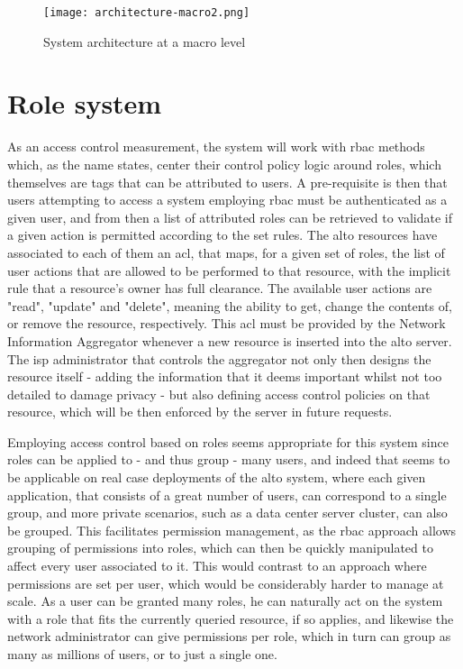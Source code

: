 \begin{figure}[H]
        \centering
        \hspace*{-4em}
        \texttt{[image: architecture-macro2.png]}
        \caption{System architecture at a macro level}
        \label{fig:macro-architecture}
\end{figure}

\section{Role system}
\label{sec:system-roles}

    As an access control measurement, the system will work with \gls{rbac} methods which, as the name states, center their control policy logic around roles, which themselves are tags that can be attributed to users.
    A pre-requisite is then that users attempting to access a system employing \gls{rbac} must be authenticated as a given user, and from then a list of attributed roles can be retrieved to validate if a given action is permitted according to the set rules.
    The \gls{alto} resources have associated to each of them an \gls{acl}, that maps, for a given set of roles, the list of user actions that are allowed to be performed to that resource, with the implicit rule that a resource's owner has full clearance.
    The available user actions are "read", "update" and "delete", meaning the ability to get, change the contents of, or remove the resource, respectively.
    This \gls{acl} must be provided by the Network Information Aggregator whenever a new resource is inserted into the \gls{alto} server.
    The \gls{isp} administrator that controls the aggregator not only then designs the resource itself - adding the information that it deems important whilst not too detailed to damage privacy - but also defining access control policies on that resource, which will be then enforced by the server in future requests.

    Employing access control based on roles seems appropriate for this system since roles can be applied to - and thus group - many users, and indeed that seems to be applicable on real case deployments of the \gls{alto} system, where each given application, that consists of a great number of users, can correspond to a single group, and more private scenarios, such as a data center server cluster, can also be grouped.
    This facilitates permission management, as the \gls{rbac} approach allows grouping of permissions into roles, which can then be quickly manipulated to affect every user associated to it.
    This would contrast to an approach where permissions are set per user, which would be considerably harder to manage at scale.
    As a user can be granted many roles, he can naturally act on the system with a role that fits the currently queried resource, if so applies, and likewise the network administrator can give permissions per role, which in turn can group as many as millions of users, or to just a single one.


